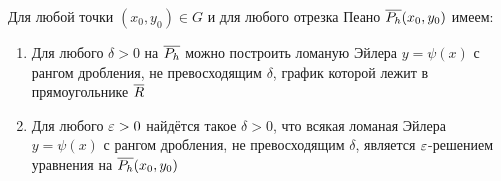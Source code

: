 \begin{lemma}
    Для любой точки $ (x_0, y_0) \in G $ и для любого отрезка Пеано $ \overline{P_h}(x_0, y_0) $ имеем:
    \begin{enumerate}
        \item Для любого $ \delta > 0 $ на $ \overline{P_h} $ можно построить ломаную Эйлера $ y = \psi(x) $ с рангом дробления, не превосходящим $ \delta $, график которой лежит в прямоугольнике $ \overline{R} $ 
        \item Для любого $ \varepsilon > 0 $ найдётся такое $ \delta > 0 $, что всякая ломаная Эйлера $ y = \psi(x) $ с рангом дробления, не превосходящим $ \delta $, является $ \varepsilon $-решением уравнения  на $ \overline{P_h}(x_0, y_0) $
    \end{enumerate}
\end{lemma}

